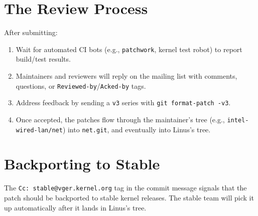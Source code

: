 \documentclass[11pt,a4paper,openany]{book}
\begin{document}
\section{The Review Process}

After submitting:
\begin{enumerate}
\item Wait for automated CI bots (e.g., \texttt{patchwork}, kernel test
    robot) to report build/test results.
\item Maintainers and reviewers will reply on the mailing list with
    comments, questions, or \texttt{Reviewed-by}/\texttt{Acked-by} tags.
\item Address feedback by sending a \texttt{v3} series with
    \texttt{git format-patch -v3}.
\item Once accepted, the patches flow through the maintainer's tree
    (e.g., \texttt{intel-wired-lan/net}) into
    \texttt{net.git}, and eventually into Linus's tree.
\end{enumerate}

\section{Backporting to Stable}

The \texttt{Cc: stable@vger.kernel.org} tag in the commit message
signals that the patch should be backported to stable kernel releases.
The stable team will pick it up automatically after it lands in
Linus's tree.

\backmatter
\end{document}
